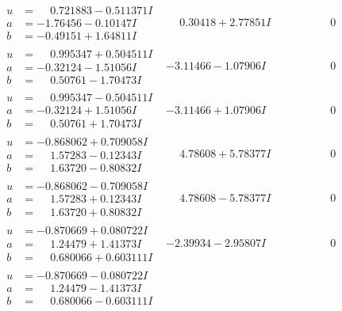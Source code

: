 \documentclass[1p]{elsarticle_modified}
\theoremstyle{definition}
\begin{document}
$$\begin{array}{c|c|c}
\begin{aligned}
u &= \phantom{-}0.721883 - 0.511371 I \\
a &= -1.76456 - 0.10147 I \\
b &= -0.49151 + 1.64811 I\end{aligned}
 & \phantom{-}0.30418 + 2.77851 I & \phantom{-0.000000 } 0 \\ \hline\begin{aligned}
u &= \phantom{-}0.995347 + 0.504511 I \\
a &= -0.32124 - 1.51056 I \\
b &= \phantom{-}0.50761 - 1.70473 I\end{aligned}
 & -3.11466 - 1.07906 I & \phantom{-0.000000 } 0 \\ \hline\begin{aligned}
u &= \phantom{-}0.995347 - 0.504511 I \\
a &= -0.32124 + 1.51056 I \\
b &= \phantom{-}0.50761 + 1.70473 I\end{aligned}
 & -3.11466 + 1.07906 I & \phantom{-0.000000 } 0 \\ \hline\begin{aligned}
u &= -0.868062 + 0.709058 I \\
a &= \phantom{-}1.57283 - 0.12343 I \\
b &= \phantom{-}1.63720 - 0.80832 I\end{aligned}
 & \phantom{-}4.78608 + 5.78377 I & \phantom{-0.000000 } 0 \\ \hline\begin{aligned}
u &= -0.868062 - 0.709058 I \\
a &= \phantom{-}1.57283 + 0.12343 I \\
b &= \phantom{-}1.63720 + 0.80832 I\end{aligned}
 & \phantom{-}4.78608 - 5.78377 I & \phantom{-0.000000 } 0 \\ \hline\begin{aligned}
u &= -0.870669 + 0.080722 I \\
a &= \phantom{-}1.24479 + 1.41373 I \\
b &= \phantom{-}0.680066 + 0.603111 I\end{aligned}
 & -2.39934 - 2.95807 I & \phantom{-0.000000 } 0 \\ \hline\begin{aligned}
u &= -0.870669 - 0.080722 I \\
a &= \phantom{-}1.24479 - 1.41373 I \\
b &= \phantom{-}0.680066 - 0.603111 I\end{aligned}

\end{array}$$
\end{document}
